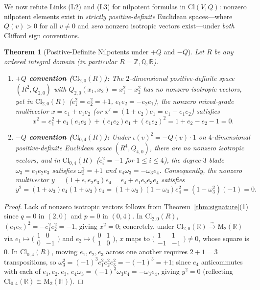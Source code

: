 \documentclass[11pt]{article}
\newtheorem{theorem}{Theorem}[section]
\theoremstyle{definition}
\newcommand{\Cl}{\mathrm{Cl}}
\newcommand{\Mat}{\mathrm{M}}
\newcommand{\R}{\mathbb{R}}
\newcommand{\Q}{\mathbb{Q}}
\newcommand{\Z}{\mathbb{Z}}
\newcommand{\HH}{\mathbb{H}}
\begin{document}
We now refute Links (L2) and (L3) for nilpotent formulas in $\Cl(V, Q)$: nonzero
nilpotent elements exist in \emph{strictly positive-definite} Euclidean spaces---where
$Q(v) > 0$ for all $v \ne 0$ and \emph{zero} nonzero isotropic vectors exist---under
\emph{both} Clifford sign conventions.

\begin{theorem}[Positive-Definite Nilpotents under $+Q$ and $-Q$]\label{thm:posdef}
Let $R$ be any ordered integral domain (in particular $R = \Z, \Q, \R$).
\begin{enumerate}
  \item \textbf{$+Q$ convention ($\Cl_{2,0}(R)$):} The $2$-dimensional positive-definite
    space $(R^2, Q_{2,0})$ with $Q_{2,0}(x_1, x_2) = x_1^2 + x_2^2$ has no nonzero
    isotropic vectors, yet in $\Cl_{2,0}(R)$ ($e_1^2 = e_2^2 = +1$, $e_1 e_2 = -e_2 e_1$),
    the nonzero mixed-grade multivector $x = e_1 + e_1 e_2$ (or $x' = (1 + e_2)e_1 = e_1 - e_1 e_2$)
    satisfies
    \[
      x^2 = e_1^2 + e_1(e_1 e_2) + (e_1 e_2)e_1 + (e_1 e_2)^2
          = 1 + e_2 - e_2 - 1 = 0.
    \]
  \item \textbf{$-Q$ convention ($\Cl_{0,4}(R)$):} Under $\iota(v)^2 = -Q(v)\cdot 1$ on
    $4$-dimensional positive-definite Euclidean space $(R^4, Q_{4,0})$, there are no
    nonzero isotropic vectors, and in $\Cl_{0,4}(R)$ ($e_i^2 = -1$ for $1 \le i \le 4$),
    the degree-$3$ blade $\omega_3 = e_1 e_2 e_3$ satisfies $\omega_3^2 = +1$ and
    $e_4 \omega_3 = -\omega_3 e_4$. Consequently, the nonzero multivector
    $y = (1 + e_1 e_2 e_3)e_4 = e_4 + e_1 e_2 e_3 e_4$ satisfies
    \[
      y^2 = (1 + \omega_3)e_4(1 + \omega_3)e_4
          = (1 + \omega_3)(1 - \omega_3)e_4^2
          = (1 - \omega_3^2)(-1) = 0.
    \]
\end{enumerate}
\end{theorem}
\begin{proof}
Lack of nonzero isotropic vectors follows from Theorem~\ref{thm:signature}(1) since
$q = 0$ in $(2, 0)$ and $p = 0$ in $(0, 4)$. In $\Cl_{2,0}(R)$, $(e_1 e_2)^2 = -e_1^2 e_2^2 = -1$,
giving $x^2 = 0$; concretely, under $\Cl_{2,0}(\R) \xrightarrow{\sim} \Mat_2(\R)$ via
$e_1 \mapsto \bigl(\begin{smallmatrix} 1 & 0 \\ 0 & -1 \end{smallmatrix}\bigr)$ and
$e_2 \mapsto \bigl(\begin{smallmatrix} 0 & 1 \\ 1 & 0 \end{smallmatrix}\bigr)$, $x$ maps to
$\bigl(\begin{smallmatrix} 1 & 1 \\ -1 & -1 \end{smallmatrix}\bigr) \ne 0$, whose square is
$0$. In $\Cl_{0,4}(R)$, moving $e_1, e_2, e_3$ across one another requires $2 + 1 = 3$
transpositions, so $\omega_3^2 = (-1)^3 e_1^2 e_2^2 e_3^2 = -(-1)^3 = +1$; since $e_4$
anticommutes with each of $e_1, e_2, e_3$, $e_4 \omega_3 = (-1)^3 \omega_3 e_4 = -\omega_3 e_4$,
giving $y^2 = 0$ (reflecting $\Cl_{0,4}(\R) \cong \Mat_2(\HH)$).
\end{proof}
\end{document}
